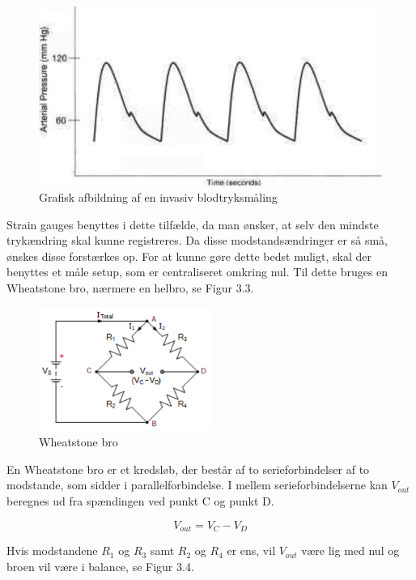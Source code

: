 \begin{figure}[H]
	\centering
	\includegraphics[width=1\textwidth]{Figurer/Snip20151207_51}
	\caption{Grafisk afbildning af en invasiv blodtryksmåling}
\end{figure}

Strain gauges benyttes i dette tilfælde, da man ønsker, at selv den mindste trykændring skal kunne registreres. Da disse modstandsændringer er så små, ønskes disse forstærkes op. For at kunne gøre dette bedst muligt, skal der benyttes et måle setup, som er centraliseret omkring nul. Til dette bruges en Wheatstone bro, nærmere en helbro, se Figur 3.3. 

\begin{figure}[H]
	\centering
	\includegraphics[width=0.5\textwidth]{Figurer/Snip20151207_63}
	\caption{Wheatstone bro}
\end{figure}

En Wheatstone bro er et kredsløb, der består af to serieforbindelser af to modstande, som sidder i parallelforbindelse. I mellem serieforbindelserne kan $V_{out}$ beregnes ud fra spændingen ved punkt C og punkt D.

\begin{equation}
	V_{out} = V_{C} - V_{D}
\end{equation} 

Hvis modstandene $R_{1}$ og $R_{3}$ samt $R_{2}$ og $R_{4}$ er ens, vil $V_{out}$ være lig med nul og broen vil være i balance, se Figur 3.4. 

